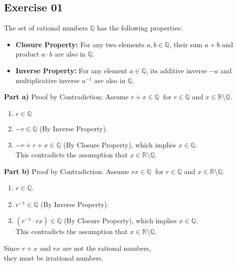 \subsection*{Exercise 01}
The set of rational numbers $\mathbb{Q}$ has the following properties:
\begin{itemize}
    \item \textbf{Closure Property:} For any two elements $a, b \in \mathbb{Q}$, their sum $a + b$ and product $a \cdot b$ are also in $\mathbb{Q}$.
    \item \textbf{Inverse Property:} For any element $a \in \mathbb{Q}$, its additive inverse $-a$ and multiplicative inverse $a^{-1}$ are also in $\mathbb{Q}$.
\end{itemize}

\begin{flushleft}
\textbf{Part a)} Proof by Contradiction: Assume $r + x \in \mathbb{Q}\ $ for $r \in \mathbb{Q}$ and $x \in \mathbb{R} \setminus \mathbb{Q}$.
\begin{enumerate}
    \item $r \in \mathbb{Q}$
    \item $-r \in \mathbb{Q}$ (By Inverse Property).
    \item $-r + r + x \in \mathbb{Q}$ (By Closure Property), which implies $x \in \mathbb{Q}$. 
    \\
    This contradicts the assumption that $x \in \mathbb{R} \setminus \mathbb{Q}$.
\end{enumerate}
\end{flushleft}

\begin{flushleft}
\textbf{Part b)} Proof by Contradiction: Assume $rx \in \mathbb{Q}\ $ for $r \in \mathbb{Q}$ and $x \in \mathbb{R} \setminus \mathbb{Q}$.
\begin{enumerate}
    \item $r \in \mathbb{Q}$.
    \item $r^{-1} \in \mathbb{Q}$ (By Inverse Property).
    \item $(r^{-1} \cdot rx) \in \mathbb{Q}$ (By Closure Property), which implies $x \in \mathbb{Q}$. 
    \\
    This contradicts the assumption that $x \in \mathbb{R} \setminus \mathbb{Q}$.
\end{enumerate}
\end{flushleft}

\begin{flushleft}
Since $r + x$ and $rx$ are not the rational numbers, \\
they must be irrational numbers. 
\end{flushleft}